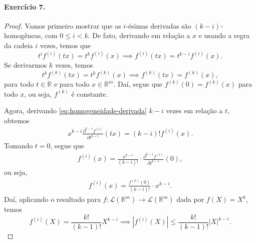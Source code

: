 \documentclass[12pt,a4paper]{article}
\newcommand{\R}{\mathbb{R}}
\begin{document}
\paragraph{Exercício 7.}
    \begin{proof}
        Vamos primeiro mostrar que as $i$-ésimas derivadas são $(k-i)$-homogêneas, com $0\leq i < k$.
        De fato, derivando em relação a $x$ e usando a regra da cadeia $i$ vezes, temos que
        \begin{equation}
        \label{eq:homogeneidade-derivada}
            t^i f^{(i)}(tx) = t^kf^{(i)}(x) \implies f^{(i)}(tx) = t^{k-i}f^{(i)}(x).
        \end{equation}
        Se derivarmos $k$ vezes, temos
        \begin{equation*}
            t^k f^{(k)}(tx) = t^kf^{(k)}(x) \implies f^{(k)}(tx) = f^{(k)}(x),
        \end{equation*}
        para todo $t\in\R$ e para todo $x\in\R^m$. Daí, segue que $f^{(k)}(0) = f^{(k)}(x)$ para todo 
        $x$, ou seja, $f^{(k)}$ é constante.
        
        Agora, derivando \eqref{eq:homogeneidade-derivada} $k-i$ vezes em relação a $t$, obtemos
        \begin{align*}
            x^{k-i}\frac{\partial^{k-i}f^{(i)}}{\partial t^{k-i}}(tx) 
            = (k-i)!f^{(i)}(x).
        \end{align*}
        Tomando $t=0$, segue que
        \begin{align*}
            f^{(i)}(x) =
            \frac{x^{k-i}}{(k-i)!}\cdot\frac{\partial^{k-i}f^{(i)}}{\partial t^{k-i}}(0),
        \end{align*}
        ou seja,
        \begin{align*}
            f^{(i)}(x) =
            \frac{f^{(k)}(0)}{(k-i)!}\cdot x^{k-i}.
        \end{align*}
        Daí, aplicando o resultado para $f:\mathcal{L}(\R^m)\to\mathcal{L}(\R^m)$ dada por $f(X) = X^k$,
        temos
        \begin{equation*}
            f^{(i)}(X) = \frac{k!}{(k-1)!}X^{k-i} \implies 
            |f^{(i)}(X)| \leq \frac{k!}{(k-1)!}|X|^{k-i}.
        \end{equation*}
    \end{proof}
\end{document}
